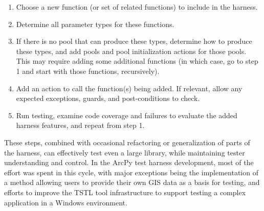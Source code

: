 \begin{enumerate}
\item Choose a new function (or set of related functions) to include
  in the harness.
\item Determine all parameter types for these functions.
\item If there is no pool that can produce these types, determine how
  to produce these types, and add pools and pool initialization actions for
  those pools.  This may require adding some additional
  functions (in which case, go to step 1 and start with those
  functions, recursively).
\item Add an action to call the function(s) being added.  If relevant,
  allow any expected exceptions, guards, and post-conditions to check.
\item Run testing, examine code coverage and failures to evaluate the
  added harness features, and repeat from step 1.
\end{enumerate}

These steps, combined with occasional refactoring or generalization of
parts of the harness, can effectively test even a large library, while
maintaining tester understanding and control.   In the ArcPy test
harness development, most of the effort was spent in this cycle, with
major exceptions being the implementation of a method allowing users
to provide their own GIS data as a basis for testing, and efforts to
improve the TSTL tool infrastructure to support testing a complex
application in a Windows environment.

